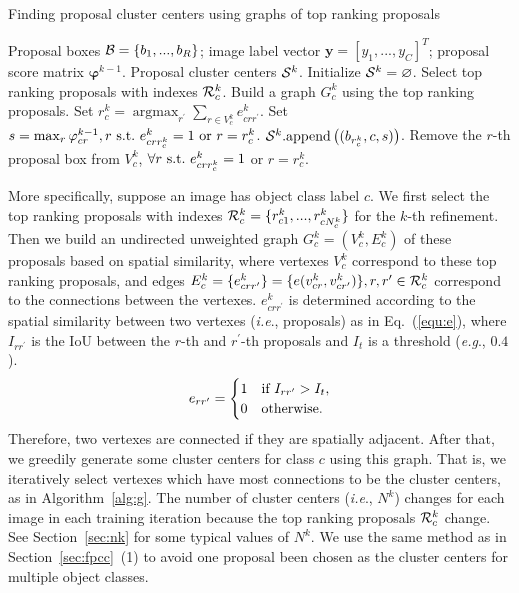 \documentclass[10pt,journal,compsoc]{IEEEtran}
\DeclareMathOperator*{\argmax}{argmax}
\def\eg{\emph{e.g}.} \def\Eg{\emph{E.g}.}
\def\ie{\emph{i.e}.} \def\Ie{\emph{I.e}.}
\begin{document}
\begin{algorithm}[t]
\caption{Finding proposal cluster centers using graphs of top ranking proposals}
\label{alg:g}
\begin{algorithmic}[1]
   \REQUIRE Proposal boxes ${\cal B} = \{b_{1}, ..., b_{R}\}$; image label vector $\mathbf{y} = [y_{1}, ..., y_{C}]^{T}$; proposal score matrix $\bm{\varphi}^{k-1}$.
   \ENSURE Proposal cluster centers ${\cal S}^{k}$.
   \STATE Initialize ${\cal S}^{k} = \varnothing$.
         \STATE Select top ranking proposals with indexes ${\cal R}^{k}_{c}$.
         \STATE Build a graph $G^{k}_{c}$ using the top ranking proposals.
         \REPEAT 
            \STATE Set $r^{k}_{c} = \argmax_{r^{\prime}}\sum_{r \in V^{k}_{c}}e^{k}_{crr^{\prime}}$.
            \STATE Set $s = \max_{r} \varphi^{k-1}_{cr}, r\ \textup{s.t.}\ e^{k}_{crr^{k}_{c}} = 1\ \textup{or}\ r = r^{k}_{c}$.
            \STATE ${\cal S}^{k}\textup{.append}\left((b_{r^{k}_{c}}, c, s)\right)$.
            \STATE Remove the $r$-th proposal box from $V^{k}_{c}$, $\forall r\ \textup{s.t.}\ e^{k}_{crr^{k}_{c}} = 1$ or $r = r^{k}_{c}$.
      \ENDIF
   \ENDFOR
\end{algorithmic}
\end{algorithm}


More specifically, suppose an image has object class label $c$.
We first select the top ranking proposals with indexes ${\cal R}^{k}_{c} = \{r^{k}_{c1}, ..., r^{k}_{cN^{k}_{c}}\}$ for the $k$-th refinement.
Then we build an undirected unweighted graph $G^{k}_{c} = (V^{k}_{c}, E^{k}_{c})$ of these proposals based on spatial similarity,
where vertexes $V^{k}_{c}$ correspond to these top ranking proposals,
and edges $E^{k}_{c} = \{e^{k}_{crr^{\prime}}\} = \{e(v^{k}_{cr}, v^{k}_{cr^{\prime}})\}, r,r^{\prime} \in {\cal R}^{k}_{c}$ correspond to the connections between the vertexes.
$e^{k}_{crr^{\prime}}$ is determined according to the spatial similarity between two vertexes (\ie, proposals) as in Eq.~(\ref{equ:e}),
where $I_{rr^{\prime}}$ is the IoU between the $r$-th and $r^{\prime}$-th proposals and $I_{t}$ is a threshold (\eg, $0.4$).
\begin{equation}
\label{equ:e}
   e_{rr^{\prime}} = 
   \begin{cases}
      1 & \textup{if} \ I_{rr^{\prime}} > I_{t},\\
      0 & \textup{otherwise.}
   \end{cases}
\end{equation}
Therefore, two vertexes are connected if they are spatially adjacent.
After that, we greedily generate some cluster centers for class $c$ using this graph.
That is, we iteratively select vertexes which have most connections to be the cluster centers, as in Algorithm~\ref{alg:g}.
{The number of cluster centers (\ie, $N^{k}$) changes for each image in each training iteration
because the top ranking proposals ${\cal R}^{k}_{c}$ change.
See} {Section~\ref{sec:nk} for some typical values of $N^{k}$.}
We use the same method as in Section~\ref{sec:fpcc}~(1)
to avoid one proposal been chosen as the cluster centers for multiple object classes.
\end{document}
